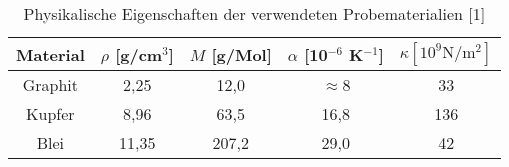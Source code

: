 \begin{table}[h]
	\begin{center}
		\begin{tabular}{c|cccc}
			Material&$\rho$ [g/cm$^3$]&$M$ [g/Mol]&$\alpha$ [10$^{-6}$ K$^{-1}$]&$\kappa [10^9\text{N}/\text{m}^2]$ \\ \hline
			Graphit&2,25&12,0&$\approx$8&33\\
			Kupfer&8,96&63,5&16,8&136\\
			Blei&11,35&207,2&29,0&42
		\end{tabular}
		\caption{Physikalische Eigenschaften der verwendeten Probematerialien [1]}
		\label{tablitdata}
	\end{center}
\end{table}